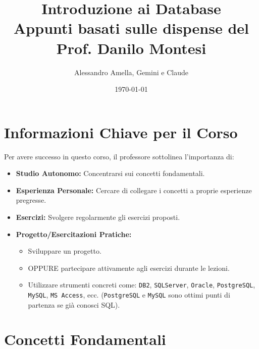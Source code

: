 

\usepackage{hyperref}

\title{Introduzione ai Database\\
  \large Appunti basati sulle dispense del Prof. Danilo Montesi}
\author{Alessandro Amella, Gemini e Claude}
\date{\today}


	
	\maketitle
	\tableofcontents
	\newpage
	
	\section{Informazioni Chiave per il Corso}
	Per avere successo in questo corso, il professore sottolinea l'importanza di:
	\begin{itemize}
		\item \textbf{Studio Autonomo:} Concentrarsi sui concetti fondamentali.
		\item \textbf{Esperienza Personale:} Cercare di collegare i concetti a proprie esperienze pregresse.
		\item \textbf{Esercizi:} Svolgere regolarmente gli esercizi proposti.
		\item \textbf{Progetto/Esercitazioni Pratiche:}
		\begin{itemize}
			\item Sviluppare un progetto.
			\item OPPURE partecipare attivamente agli esercizi durante le lezioni.
			\item Utilizzare strumenti concreti come: \texttt{DB2}, \texttt{SQLServer}, \texttt{Oracle}, \texttt{PostgreSQL}, \texttt{MySQL}, \texttt{MS Access}, ecc. (\texttt{PostgreSQL} e \texttt{MySQL} sono ottimi punti di partenza se già conosci SQL).
		\end{itemize}
	\end{itemize}
	
	\section{Concetti Fondamentali}
	
